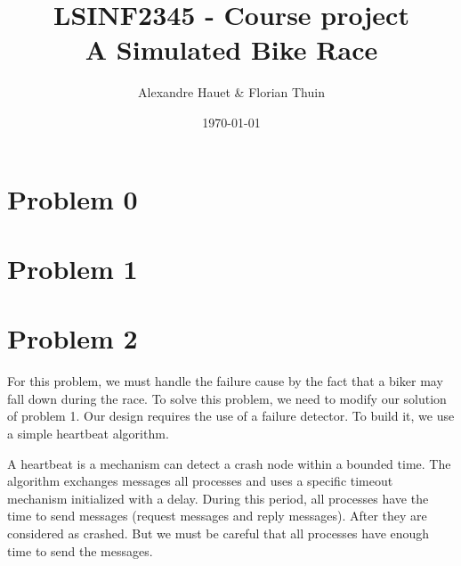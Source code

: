 \documentclass{article}
\title{LSINF2345 - Course project \\ A Simulated Bike Race}
\author{Alexandre Hauet \& Florian Thuin}
\date{\today}
\begin{document}
\maketitle

\section*{Problem 0}

\section*{Problem 1}

\section*{Problem 2}
For this problem, we must handle the failure cause by the fact that a biker may fall down during the race.
To solve this problem, we need to modify our solution of problem 1. Our design requires the use of a 
failure detector. To build it, we use a simple heartbeat algorithm.

A heartbeat is a mechanism can detect a crash node within a bounded time. The algorithm exchanges 
messages all processes and uses a specific timeout mechanism initialized with a delay. During this period,
all processes have the time to send messages (request messages and reply messages). After they are considered as crashed. But we must be careful that
all processes have enough time to send the messages. 
\end{document}
